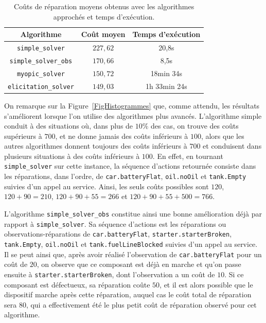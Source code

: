 \documentclass[a4paper,11pt]{article}
\theoremstyle{plain}
\theoremstyle{definition}
\begin{document}
\begin{table}[ht]
\centering
\caption{Coûts de réparation moyens obtenus avec les algorithmes approchés et temps d'exécution.}
\label{TabECs}
\begin{tabular}{ccc}
\toprule
Algorithme & Coût moyen & Temps d'exécution \tabularnewline
\midrule
\texttt{simple\_solver} & $227,62$ & 20,8s\tabularnewline
\texttt{simple\_solver\_obs} & $170,66$ & 8,5s \tabularnewline
\texttt{myopic\_solver} & $150,72$ & 18min 34s\tabularnewline
\texttt{elicitation\_solver} & $149,03$ & 1h 33min 24s\tabularnewline
\bottomrule
\end{tabular}
\end{table}

On remarque sur la Figure~\ref{FigHistogrammes} que, comme attendu, les résultats s'améliorent lorsque l'on utilise des algorithmes plus avancés. L'algorithme simple conduit à des situations où, dans plus de $10\%$ des cas, on trouve des coûts supérieurs à $700$, et ne donne jamais des coûts inférieurs à $100$, alors que les autres algorithmes donnent toujours des coûts inférieurs à $700$ et conduisent dans plusieurs situations à des coûts inférieurs à $100$. En effet, en tournant \texttt{simple\_solver} sur cette instance, la séquence d'actions retournée consiste dans les réparations, dans l'ordre, de \texttt{car.batteryFlat}, \texttt{oil.noOil} et \texttt{tank.Empty} suivies d'un appel au service. Ainsi, les seuls coûts possibles sont $120$, $120+90 = 210$, $120+90+55 = 266$ et $120+90+55+500 = 766$.

L'algorithme \texttt{simple\_solver\_obs} constitue ainsi une bonne amélioration déjà par rapport à \texttt{simple\_solver}. Sa séquence d'actions est les réparations ou observations-réparations de \texttt{car.\allowbreak{}batteryFlat}, \texttt{starter.starterBroken}, \texttt{tank.Empty}, \texttt{oil.noOil} et \texttt{tank.fuelLineBlocked} suivies d'un appel au service. Il se peut ainsi que, après avoir réalisé l'observation de \texttt{car.battery\allowbreak{}Flat} pour un coût de $20$, on observe que ce composant est déjà en marche et qu'on passe ensuite à \texttt{starter.starterBroken}, dont l'observation a un coût de $10$. Si ce composant est défectueux, sa réparation coûte $50$, et il est alors possible que le dispositif marche après cette réparation, auquel cas le coût total de réparation sera $80$, qui a effectivement été le plus petit coût de réparation observé pour cet algorithme.
\end{document}
